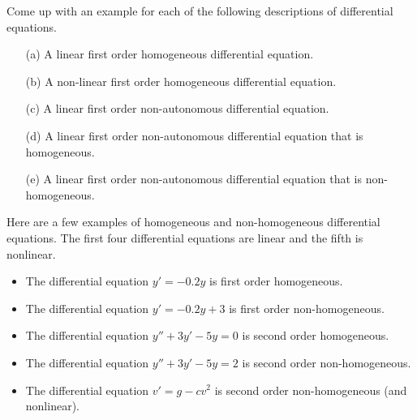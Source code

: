 \begin{problem}
    Come up with an example for each of the following descriptions of differential
    equations.
    \begin{enumerate}
        \item[(a)] A linear first order homogeneous differential equation.
        \item[(b)] A non-linear first order homogeneous differential equation.
        \item[(c)] A linear first order non-autonomous differential equation.
        \item[(d)] A linear first order non-autonomous differential equation that is
            homogeneous.
        \item[(e)] A linear first order non-autonomous differential equation that is
            non-homogeneous.
    \end{enumerate}
\end{problem}
\begin{example}
    Here are a few examples of homogeneous and non-homogeneous differential equations. The
    first four differential equations are linear and the fifth is nonlinear.
    \begin{itemize}
        \item The differential equation $y' = -0.2y$ is first order homogeneous.
        \item The differential equation $y' = -0.2y + 3$ is first order non-homogeneous.
        \item The differential equation $y'' + 3y' - 5y = 0$ is second order homogeneous.
        \item The differential equation $y'' + 3y' - 5y = 2$ is second order non-homogeneous.
        \item The differential equation $v' = g - c v^2$ is second order non-homogeneous (and
            nonlinear).
    \end{itemize}
\end{example}

\newpage
